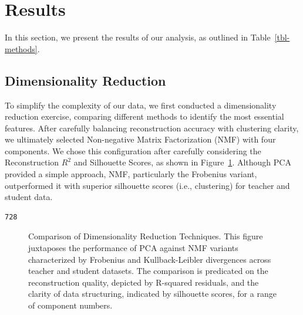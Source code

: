 \documentclass[
  number,
  preprint,
  3p,
  onecolumn]{elsarticle}
\begin{document}
\section{Results}\label{results}

In this section, we present the results of our analysis, as outlined in
Table~\ref{tbl-methods}.

\subsection{Dimensionality Reduction}\label{dimensionality-reduction-1}

To simplify the complexity of our data, we first conducted a
dimensionality reduction exercise, comparing different methods to
identify the most essential features. After carefully balancing
reconstruction accuracy with clustering clarity, we ultimately selected
Non-negative Matrix Factorization (NMF) with four components. We chose
this configuration after carefully considering the Reconstruction
\(R^2\) and Silhouette Scores, as shown in
Figure~\ref{fig-nmf-pca-comparison}. Although PCA provided a simple
approach, NMF, particularly the Frobenius variant, outperformed it with
superior silhouette scores (i.e., clustering) for teacher and student
data.

\begin{verbatim}
728
\end{verbatim}

\begin{figure}

\begin{minipage}{\linewidth}



\end{minipage}%
\newline
\begin{minipage}{\linewidth}



\end{minipage}%

\caption{\label{fig-nmf-pca-comparison}Comparison of Dimensionality
Reduction Techniques. This figure juxtaposes the performance of PCA
against NMF variants characterized by Frobenius and Kullback-Leibler
divergences across teacher and student datasets. The comparison is
predicated on the reconstruction quality, depicted by R-squared
residuals, and the clarity of data structuring, indicated by silhouette
scores, for a range of component numbers.}

\end{figure}%
\end{document}
